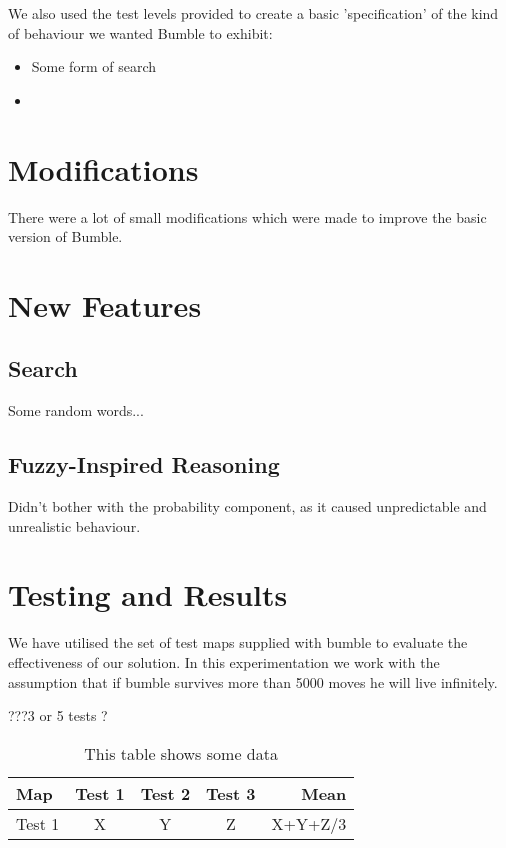 \documentclass[a4paper,oneside]{report}
\begin{document}
We also used the test levels provided to create a basic 'specification' of the kind of behaviour we wanted Bumble to exhibit:

\begin{itemize}
	\item Some form of search
	\item 
\end{itemize}


\section{Modifications}

There were a lot of small modifications which were made to improve the basic version of Bumble.

\section{New Features}

\subsection{Search}

Some random words...

\subsection{Fuzzy-Inspired Reasoning}
	
Didn't bother with the probability component, as it caused unpredictable and unrealistic behaviour.
	
\section{Testing and Results}

We have utilised the set of test maps supplied with bumble to evaluate the effectiveness of our solution. In this experimentation we work with the assumption that if bumble survives more than 5000 moves he will live infinitely.
	
	???3 or 5 tests ? 

\begin{table}[h!]
	\centering
	\begin{tabular}{| l | c | c | c | r |}
	\hline
		Map & Test 1 & Test 2 & Test 3 & Mean \\ \hline
		Test 1 &  X & Y & Z & X+Y+Z/3 \\ \hline
	\end{tabular}
	\caption{This table shows some data}
	\label{tab:myfirsttable}
\end{table}
\end{document}
